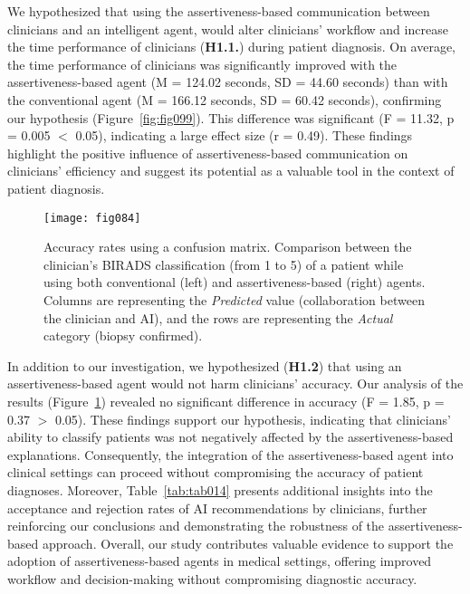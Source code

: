 We hypothesized that using the assertiveness-based communication between clinicians and an intelligent agent, would alter clinicians' workflow and increase the time performance of clinicians ({\bf H1.1.}) during patient diagnosis.
On average, the time performance of clinicians was significantly improved with the assertiveness-based agent (M = 124.02 seconds, SD = 44.60 seconds) than with the conventional agent (M = 166.12 seconds, SD = 60.42 seconds), confirming our hypothesis (Figure~\ref{fig:fig099}).
This difference was significant (F = 11.32, p = 0.005 $<$ 0.05), indicating a large effect size (r = 0.49).
These findings highlight the positive influence of assertiveness-based communication on clinicians' efficiency and suggest its potential as a valuable tool in the context of patient diagnosis.

\begin{figure}[htpb]
\centering
\texttt{[image: fig084]}
\caption[]{Accuracy rates using a confusion matrix. Comparison between the clinician's BIRADS classification (from 1 to 5) of a patient while using both conventional (left) and assertiveness-based (right) agents. Columns are representing the {\it Predicted} value (collaboration between the clinician and AI), and the rows are representing the {\it Actual} category (biopsy confirmed).}
\label{fig:fig084}
\end{figure}

In addition to our investigation, we hypothesized ({\bf H1.2}) that using an assertiveness-based agent would not harm clinicians' accuracy.
Our analysis of the results (Figure~\ref{fig:fig084}) revealed no significant difference in accuracy (F = 1.85, p = 0.37 $>$ 0.05).
These findings support our hypothesis, indicating that clinicians' ability to classify patients was not negatively affected by the assertiveness-based explanations.
Consequently, the integration of the assertiveness-based agent into clinical settings can proceed without compromising the accuracy of patient diagnoses.
Moreover, Table~\ref{tab:tab014} presents additional insights into the acceptance and rejection rates of \ac{AI} recommendations by clinicians, further reinforcing our conclusions and demonstrating the robustness of the assertiveness-based approach.
Overall, our study contributes valuable evidence to support the adoption of assertiveness-based agents in medical settings, offering improved workflow and decision-making without compromising diagnostic accuracy.

